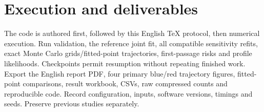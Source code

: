 \documentclass[11pt]{article}
\begin{document}
\section{Execution and deliverables}
The code is authored first, followed by this English TeX protocol, then numerical execution. Run validation, the reference joint fit, all compatible sensitivity refits, exact Monte Carlo grids/fitted-point trajectories, first-passage risks and profile likelihoods. Checkpoints permit resumption without repeating finished work. Export the English report PDF, four primary blue/red trajectory figures, fitted-point comparisons, result workbook, CSVs, raw compressed counts and reproducible code. Record configuration, inputs, software versions, timings and seeds. Preserve previous studies separately.

\end{document}
